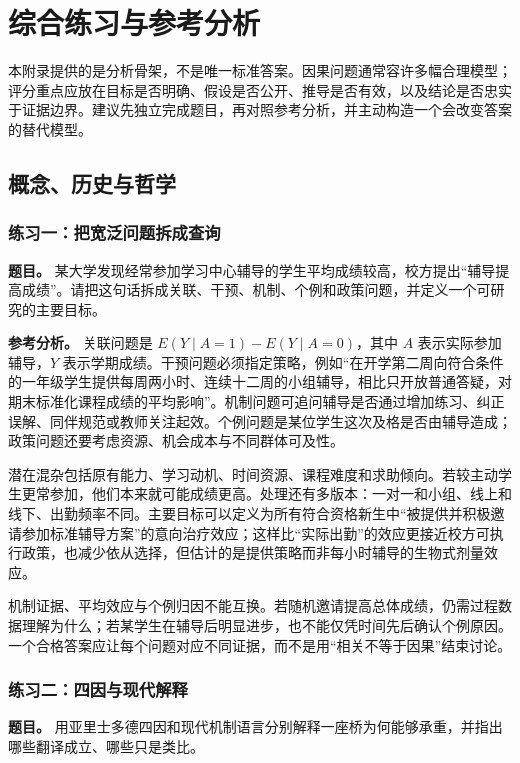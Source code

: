 \chapter{综合练习与参考分析}
\label{app:exercises}

本附录提供的是分析骨架，不是唯一标准答案。因果问题通常容许多幅合理模型；评分重点应放在目标是否明确、假设是否公开、推导是否有效，以及结论是否忠实于证据边界。建议先独立完成题目，再对照参考分析，并主动构造一个会改变答案的替代模型。

\section{概念、历史与哲学}

\subsection*{练习一：把宽泛问题拆成查询}

\textbf{题目。} 某大学发现经常参加学习中心辅导的学生平均成绩较高，校方提出“辅导提高成绩”。请把这句话拆成关联、干预、机制、个例和政策问题，并定义一个可研究的主要目标。

\textbf{参考分析。} 关联问题是 $E(Y\mid A=1)-E(Y\mid A=0)$，其中 $A$ 表示实际参加辅导，$Y$ 表示学期成绩。干预问题必须指定策略，例如“在开学第二周向符合条件的一年级学生提供每周两小时、连续十二周的小组辅导，相比只开放普通答疑，对期末标准化课程成绩的平均影响”。机制问题可追问辅导是否通过增加练习、纠正误解、同伴规范或教师关注起效。个例问题是某位学生这次及格是否由辅导造成；政策问题还要考虑资源、机会成本与不同群体可及性。

潜在混杂包括原有能力、学习动机、时间资源、课程难度和求助倾向。若较主动学生更常参加，他们本来就可能成绩更高。处理还有多版本：一对一和小组、线上和线下、出勤频率不同。主要目标可以定义为所有符合资格新生中“被提供并积极邀请参加标准辅导方案”的意向治疗效应；这样比“实际出勤”的效应更接近校方可执行政策，也减少依从选择，但估计的是提供策略而非每小时辅导的生物式剂量效应。

机制证据、平均效应与个例归因不能互换。若随机邀请提高总体成绩，仍需过程数据理解为什么；若某学生在辅导后明显进步，也不能仅凭时间先后确认个例原因。一个合格答案应让每个问题对应不同证据，而不是用“相关不等于因果”结束讨论。

\subsection*{练习二：四因与现代解释}

\textbf{题目。} 用亚里士多德四因和现代机制语言分别解释一座桥为何能够承重，并指出哪些翻译成立、哪些只是类比。

